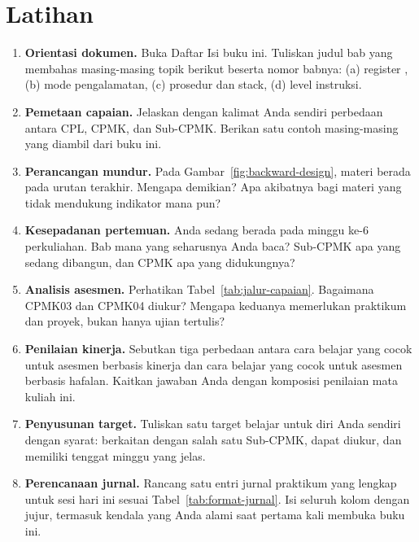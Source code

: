 \section{Latihan}
\label{sec:latihan-bab1}

\begin{enumerate}
    \item \textbf{Orientasi dokumen.} Buka Daftar Isi buku ini.
          Tuliskan judul bab yang membahas masing-masing topik berikut
          beserta nomor babnya: (a) register ,
          (b) mode pengalamatan, (c) prosedur dan stack,
          (d)  level instruksi.

    \item \textbf{Pemetaan capaian.} Jelaskan dengan kalimat Anda
          sendiri perbedaan antara CPL, CPMK, dan Sub-CPMK. Berikan
          satu contoh masing-masing yang diambil dari buku ini.

    \item \textbf{Perancangan mundur.} Pada
          Gambar~\ref{fig:backward-design}, materi berada pada urutan
          terakhir. Mengapa demikian? Apa akibatnya bagi materi yang
          tidak mendukung indikator mana pun?

    \item \textbf{Kesepadanan pertemuan.} Anda sedang berada pada
          minggu ke-6 perkuliahan. Bab mana yang seharusnya Anda baca?
          Sub-CPMK apa yang sedang dibangun, dan CPMK apa yang
          didukungnya?

    \item \textbf{Analisis asesmen.} Perhatikan
          Tabel~\ref{tab:jalur-capaian}. Bagaimana CPMK03 dan CPMK04
          diukur? Mengapa keduanya memerlukan praktikum dan proyek,
          bukan hanya ujian tertulis?

    \item \textbf{Penilaian kinerja.} Sebutkan tiga perbedaan antara
          cara belajar yang cocok untuk asesmen berbasis kinerja dan
          cara belajar yang cocok untuk asesmen berbasis hafalan.
          Kaitkan jawaban Anda dengan komposisi penilaian mata
          kuliah ini.

    \item \textbf{Penyusunan target.} Tuliskan satu target belajar
          untuk diri Anda sendiri dengan syarat: berkaitan dengan
          salah satu Sub-CPMK, dapat diukur, dan memiliki tenggat
          minggu yang jelas.

    \item \textbf{Perencanaan jurnal.} Rancang satu entri jurnal
          praktikum yang lengkap untuk sesi hari ini sesuai
          Tabel~\ref{tab:format-jurnal}. Isi seluruh kolom dengan
          jujur, termasuk kendala yang Anda alami saat pertama kali
          membuka buku ini.
\end{enumerate}

